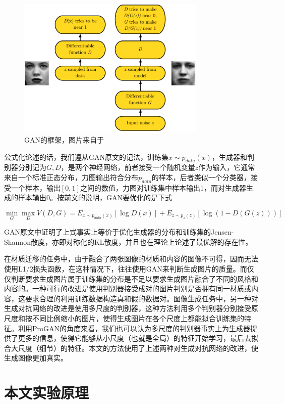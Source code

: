 \documentclass[UTF8,openany,AutoFakeBold,AutoFakeSlant,cs4size]{ctexbook}
\begin{document}
\begin{figure}
\centering
\includegraphics[width=9cm]{./images/gan_model.png}
\caption{GAN的框架，图片来自于\cite{goodfellow2016tutorial}}
\label{gan_model}
\end{figure}

公式化论述的话，我们遵从GAN原文的记法，训练集$x \sim p_{data}(x)$，生成器和判别器分别记为$G, D$，是两个神经网络，前者接受一个随机变量$z$作为输入，它通常来自一个标准正态分布，力图输出符合分布$p_{data}$的样本，后者类似一个分类器，接受一个样本，输出$[0, 1]$之间的数值，力图对训练集中样本输出1，而对生成器生成的样本输出0。按前文的说明，GAN要优化的是下式

\begin{equation}
	\min_{G} \max_{D} V(D, G) = E_{x \sim p_{data}(x)}[\log D(x)] + E_{z \sim p_{z}(z)}[\log (1 - D(G(z)))]
\end{equation}

GAN原文中证明了上式事实上等价于优化生成器的分布和训练集的Jensen-Shannon散度，亦即对称化的KL散度，并且也在理论上论述了最优解的存在性。


在材质迁移的任务中，由于融合了两张图像的材质和内容的图像不可得，因而无法使用L1/2损失函数，在这种情况下，往往使用GAN来判断生成图片的质量。而仅仅判断要求生成图片属于训练集的分布是不足以要求生成图片融合了不同的风格和内容的。一种可行的改进是使用判别器接受成对的图片判别是否拥有同一材质或内容\cite{ma2017pose}，这要求合理的利用训练数据构造真和假的数据对。图像生成任务中，另一种对生成对抗网络的改进是使用多尺度的判别器，这种方法利用多个判别器分别接受原尺度和按不同比例缩小的图片，使得生成图片在各个尺度上都能拟合训练集的特征。利用ProGAN\cite{Karras2017ProgressiveGO}的角度来看，我们也可以认为多尺度的判别器事实上为生成器提供了更多的信息，使得它能够从小尺度（也就是全局）的特征开始学习，最后去拟合大尺度（细节）的特征。本文的方法使用了上述两种对生成对抗网络的改进，使生成图像更加真实。

\section{本文实验原理}
\end{document}
